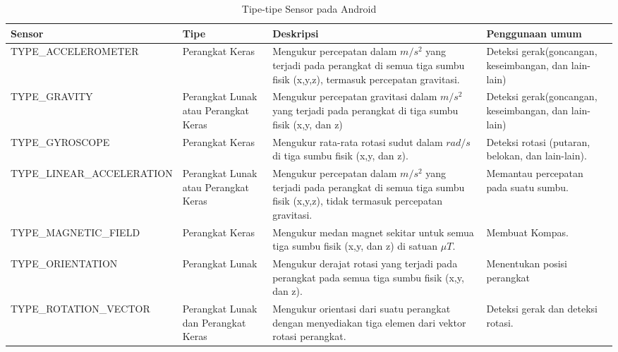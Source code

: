 \begin{table}[htbp]
	\centering
	\caption{Tipe-tipe Sensor pada Android}
\begin{tabular}{|p{6.3cm}| p{1.5cm}| p{5cm}| p{2.4cm}|} 
\hline
Sensor & Tipe & Deskripsi & Penggunaan umum\\ \hline
TYPE\_ACCELEROMETER & Perangkat Keras & Mengukur percepatan dalam \(m/s^2\) yang terjadi pada perangkat di semua tiga sumbu fisik (x,y,z), termasuk percepatan gravitasi. & Deteksi gerak(goncangan, keseimbangan, dan lain-lain)\\ \hline
TYPE\_GRAVITY & Perangkat Lunak atau Perangkat Keras & Mengukur percepatan gravitasi dalam \(m/s^2\) yang terjadi pada perangkat di tiga sumbu fisik (x,y, dan z) & Deteksi gerak(goncangan, keseimbangan, dan lain-lain)\\ \hline
TYPE\_GYROSCOPE & Perangkat Keras & Mengukur rata-rata rotasi sudut dalam \(rad/s\) di tiga sumbu fisik (x,y, dan z). & Deteksi rotasi (putaran, belokan, dan lain-lain).\\ \hline
TYPE\_LINEAR\_ACCELERATION & Perangkat Lunak atau Perangkat Keras & Mengukur percepatan dalam \(m/s^2\) yang terjadi pada perangkat di semua tiga sumbu fisik (x,y,z), tidak termasuk percepatan gravitasi. & Memantau percepatan pada suatu sumbu.\\ \hline
TYPE\_MAGNETIC\_FIELD & Perangkat Keras & Mengukur medan magnet sekitar untuk semua tiga sumbu fisik (x,y, dan z) di satuan \(\mu T\). & Membuat Kompas.\\ \hline
TYPE\_ORIENTATION & Perangkat Lunak & Mengukur derajat rotasi yang terjadi pada perangkat pada semua tiga sumbu fisik (x,y, dan z). & Menentukan posisi perangkat \\ \hline
TYPE\_ROTATION\_VECTOR & Perangkat Lunak dan Perangkat Keras & Mengukur orientasi dari suatu perangkat dengan menyediakan tiga elemen dari vektor rotasi perangkat. & Deteksi gerak dan deteksi rotasi.\\ \hline
\end{tabular}
\end{table}
